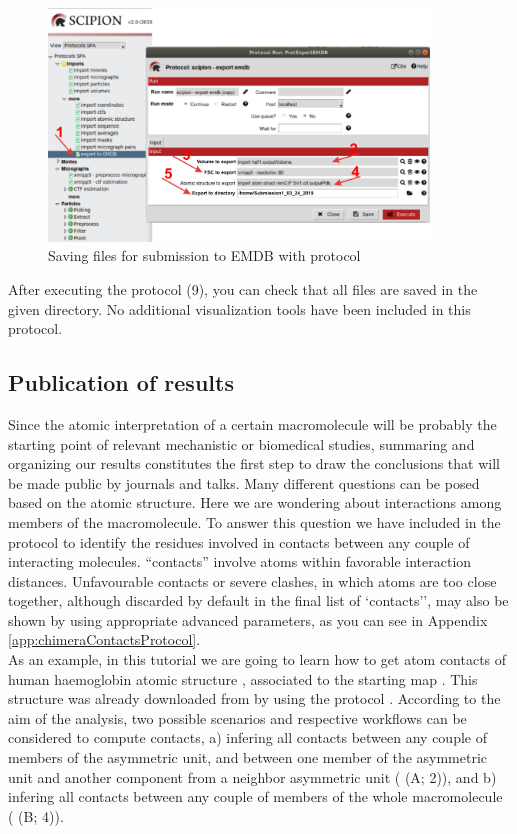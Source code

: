  \begin{figure}[H]
  \centering 
  \captionsetup{width=.7\linewidth} 
  \includegraphics[width=0.9\textwidth]{Images/Fig45}
  \caption{Saving files for submission to EMDB with protocol }
  \label{fig:export_to_EMDB_protocol}
  \end{figure}
  
After executing the protocol (9), you can check that all files are saved in the given directory. No additional visualization tools have been included in this protocol. 

\subsection*{Publication of results}

Since the atomic interpretation of a certain macromolecule will be probably the starting point of relevant mechanistic or biomedical studies, summaring and organizing our results constitutes the first step to draw the conclusions that will be made public by journals and talks. Many different questions can be posed based on the atomic structure. Here we are wondering about interactions among members of the macromolecule. To answer this question we have included in \scipion the protocol  to identify the residues involved in contacts between any couple of interacting molecules. ``contacts'' involve atoms within  favorable interaction distances. Unfavourable contacts or severe clashes, in which atoms are too close together, although discarded by default in the final list of `contacts'', may also be shown by using appropriate advanced parameters, as you can see in Appendix \ref{app:chimeraContactsProtocol}. \\

As an example, in this tutorial we are going to learn how to get atom contacts of human haemoglobin  atomic structure , associated to the starting map . This structure was already downloaded from  by using the protocol . According to the aim of the analysis, two possible scenarios and respective workflows can be considered to compute contacts, a) infering all contacts between any couple of members of the asymmetric unit, and between one member of the asymmetric unit and another component from a neighbor asymmetric unit ( (A; 2)), and b) infering all contacts between any couple of members of the whole macromolecule ( (B; 4)). 

